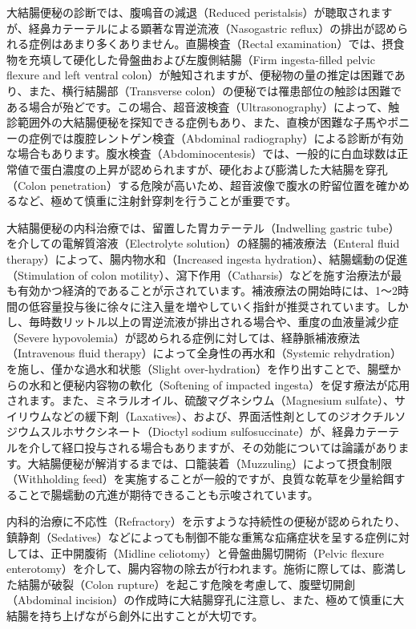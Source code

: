 大結腸便秘の診断では、腹鳴音の減退（Reduced peristalsis）が聴取されますが、経鼻カテーテルによる顕著な胃逆流液（Nasogastric reflux）の排出が認められる症例はあまり多くありません。直腸検査（Rectal examination）では、摂食物を充填して硬化した骨盤曲および左腹側結腸（Firm ingesta-filled pelvic flexure and left ventral colon）が触知されますが、便秘物の量の推定は困難であり、また、横行結腸部（Transverse colon）の便秘では罹患部位の触診は困難である場合が殆どです。この場合、超音波検査（Ultrasonography）によって、触診範囲外の大結腸便秘を探知できる症例もあり、また、直検が困難な子馬やポニーの症例では腹腔レントゲン検査（Abdominal radiography）による診断が有効な場合もあります。腹水検査（Abdominocentesis）では、一般的に白血球数は正常値で蛋白濃度の上昇が認められますが、硬化および膨満した大結腸を穿孔（Colon penetration）する危険が高いため、超音波像で腹水の貯留位置を確かめるなど、極めて慎重に注射針穿刺を行うことが重要です。

大結腸便秘の内科治療では、留置した胃カテーテル（Indwelling gastric tube）を介しての電解質溶液（Electrolyte solution）の経腸的補液療法（Enteral fluid therapy）によって、腸内物水和（Increased ingesta hydration）、結腸蠕動の促進（Stimulation of colon motility）、瀉下作用（Catharsis）などを施す治療法が最も有効かつ経済的であることが示されています。補液療法の開始時には、1～2時間の低容量投与後に徐々に注入量を増やしていく指針が推奨されています。しかし、毎時数リットル以上の胃逆流液が排出される場合や、重度の血液量減少症（Severe hypovolemia）が認められる症例に対しては、経静脈補液療法（Intravenous fluid therapy）によって全身性の再水和（Systemic rehydration）を施し、僅かな過水和状態（Slight over-hydration）を作り出すことで、腸壁からの水和と便秘内容物の軟化（Softening of impacted ingesta）を促す療法が応用されます。また、ミネラルオイル、硫酸マグネシウム（Magnesium sulfate）、サイリウムなどの緩下剤（Laxatives）、および、界面活性剤としてのジオクチルソジウムスルホサクシネート（Dioctyl sodium sulfosuccinate）が、経鼻カテーテルを介して経口投与される場合もありますが、その効能については論議があります。大結腸便秘が解消するまでは、口籠装着（Muzzuling）によって摂食制限（Withholding feed）を実施することが一般的ですが、良質な乾草を少量給餌することで腸蠕動の亢進が期待できることも示唆されています。

内科的治療に不応性（Refractory）を示すような持続性の便秘が認められたり、鎮静剤（Sedatives）などによっても制御不能な重篤な疝痛症状を呈する症例に対しては、正中開腹術（Midline celiotomy）と骨盤曲腸切開術（Pelvic flexure enterotomy）を介して、腸内容物の除去が行われます。施術に際しては、膨満した結腸が破裂（Colon rupture）を起こす危険を考慮して、腹壁切開創（Abdominal incision）の作成時に大結腸穿孔に注意し、また、極めて慎重に大結腸を持ち上げながら創外に出すことが大切です。

